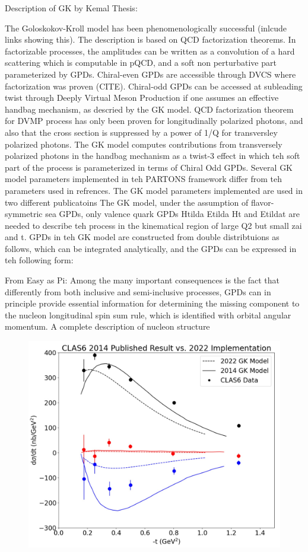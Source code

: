     Description of GK by Kemal Thesis:
    
    The Goloskokov-Kroll model has been phenomenologically successful (inlcude links showing this).  The description is based on QCD factorization theorems. In factorizable processes, the amplitudes can be written as a convolution of a hard scattering which is computable in pQCD, and a soft non perturbative part parameterized by GPDs. Chiral-even GPDs are accessible through DVCS where factorization was proven (CITE). Chiral-odd GPDs can be accessed at subleading twist through Deeply Virtual Meson Production if one assumes an effective handbag mechanism, as descried by the GK model. 
    QCD factorization theorem for DVMP process has only been proven for longitudinally polarized photons, and also that the cross section is suppressed by a power of 1/Q for transversley polarized photons. 
    The GK model computes contributions from transversely polarized photons in the handbag mechanism as a twist-3 effect in which teh soft part of the process is parameterized in terms of Chiral Odd GPDs.
    Several GK model parameters implemented in teh PARTONS framework differ from teh parameters used in refrences. The GK model parameters implemented are used in two different publicatoins
    The GK model, under the assumption of flavor-symmetric sea GPDs, only valence quark GPDs Htilda Etilda Ht and Etildat are needed to describe teh process in the kinematical region of large Q2 but small zai and t. GPDs in teh GK model are constructed from double distribtuions as follows, which can be integrated analytically, and the GPDs can be expressed in teh following form:
    
    
    From Easy as Pi:
    Among the many important consequences is the fact that differently from both inclusive and semi-inclusive processes, GPDs can in principle provide essential information
    for determining the missing component to the nucleon longitudinal spin sum rule, which
    is identified with orbital angular momentum. A complete description of nucleon structure
    
    
    \begin{figure}[hbt]
    	\centering
    	\includegraphics[page=6,width=0.6\linewidth]{Chapters/Ch5-Further/GK_model/pics/2022_vs_2014_GK_model.jpg}
    \end{figure}\label{fig:oldres2}
    
